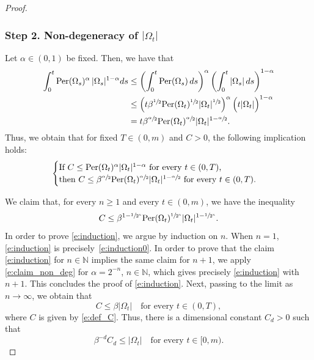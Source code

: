 \documentclass[11pt]{article}
\numberwithin{equation}{section}
\newcommand{\Per}{\mathrm{Per}}
\theoremstyle{plain}
\theoremstyle{definition}
\def\N{\mathbb{N}}
\begin{document}
\begin{proof}
\subsubsection*{Step 2. Non-degeneracy of $|\Omega_t|$}
Let $\alpha\in(0,1)$ be fixed. Then, we have that
\begin{align*}
\int_0^t \Per(\Omega_s)^\alpha\,|\Omega_s|^{1-\alpha} ds&\le \left(\int_0^t \Per(\Omega_s)\,ds\right)^{\alpha}\left(\int_0^t|\Omega_s|\,ds\right)^{1-\alpha}\\
&\le \left(t\beta^{\sfrac12} \Per(\Omega_t)^{\sfrac12}|\Omega_t|^{\sfrac12}\right)^{\alpha}\Big(t|\Omega_t|\Big)^{1-\alpha}\\
&=t\beta^{\sfrac{\alpha}{2}} \Per(\Omega_t)^{\sfrac\alpha2}|\Omega_t|^{1-\sfrac\alpha2}.
\end{align*}
Thus, we obtain that for fixed $T\in(0,m)$ and $C>0$, the following implication holds:%
\begin{equation}\label{e:claim_non_deg}
\begin{cases}
\text{If $C\le \Per(\Omega_t)^\alpha|\Omega_t|^{1-\alpha}$ for every $t\in(0,T)$,}\\
\text{then $C\le \beta^{\sfrac\alpha2} \Per(\Omega_t)^{\sfrac\alpha2}|\Omega_t|^{1-\sfrac\alpha2}$ for every $t\in(0,T)$.}
\end{cases}
\end{equation}

We claim that, for every $n\ge 1$ and every $t\in(0,m)$, we have the inequality
\begin{equation}\label{e:induction}
C\le \beta^{1-\sfrac{1}{2^{n}}}\Per(\Omega_t)^{\sfrac{1}{2^{n}}}|\Omega_t|^{1-\sfrac{1}{2^{n}}}.
\end{equation}
In order to prove \eqref{e:induction}, we argue by induction on $n$. When $n=1$, \eqref{e:induction} is precisely~\eqref{e:induction0}. In order to prove that the claim \eqref{e:induction} for $n\in \N$ implies the same claim for $n+1$, we apply \eqref{e:claim_non_deg} for $\alpha=2^{-n}$, $n\in\N$, which gives precisely \eqref{e:induction} with $n+1$. This concludes the proof of \eqref{e:induction}. Next, passing to the limit as $n\to\infty$, we obtain that
\[C\le \beta |\Omega_t|\quad\text{for every } t\in(0,T),\]
where $C$ is given by \eqref{e:def_C}. Thus, there is a dimensional constant $C_d>0$ such that
\begin{equation}\label{e:measure_non_degeneracy}
\beta^{-d} C_d\le |\Omega_t|\quad\text{for every } t\in[0,m).
\end{equation}


\end{proof}
\end{document}

